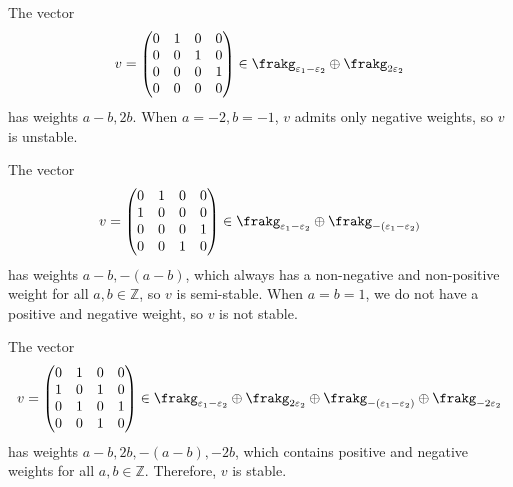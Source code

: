 \begin{example}
The vector 
$$v = 
\begin{pmatrix}
	0 & 1 & 0 & 0 \\
	0 & 0 & 1 & 0 \\
	0 & 0 & 0 & 1 \\
	0 & 0 & 0 & 0 
\end{pmatrix} \in \frakg_{\varepsilon_1 - \varepsilon_2} \oplus \frakg_{2 \varepsilon_2}
$$
has weights $a-b, 2b$.
When $a = -2, b = -1$, $v$ admits only negative weights, so $v$ is unstable.

The vector 
$$v = 
\begin{pmatrix}
	0 & 1 & 0 & 0 \\
	1 & 0 & 0 & 0 \\
	0 & 0 & 0 & 1 \\
	0 & 0 & 1 & 0 
\end{pmatrix} \in \frakg_{\varepsilon_1 - \varepsilon_2} \oplus \frakg_{-(\varepsilon_1 -  \varepsilon_2)}
$$
has weights $a-b, -(a-b)$, which always has a non-negative and non-positive weight for all $a, b \in \mathbb{Z}$, so $v$ is semi-stable.
When $a=b=1$, we do not have a positive and negative weight, so $v$ is not stable.

The vector
$$v = 
\begin{pmatrix}
	0 & 1 & 0 & 0 \\
	1 & 0 & 1 & 0 \\
	0 & 1 & 0 & 1 \\
	0 & 0 & 1 & 0 
\end{pmatrix} \in \frakg_{\varepsilon_1 - \varepsilon_2} \oplus \frakg_{2 \varepsilon_2} \oplus \frakg_{-(\varepsilon_1 -  \varepsilon_2)} \oplus \frakg_{- 2\varepsilon_2} 
$$
has weights $a-b, 2b, -(a-b), -2b$, which contains positive and negative weights for all $a, b \in \mathbb{Z}$.
Therefore, $v$ is stable.
\end{example}

